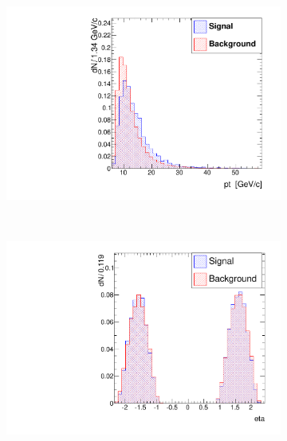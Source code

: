 \documentclass[10pt,a4paper]{article}
\begin{document}
\begin{figure}
        \centering
        \begin{subfigure}[b]{0.2\textwidth}
                \centering
                \includegraphics[width=\textwidth]{Figures/pt_endcaps}
                \label{fig:ptEndcaps}
        \end{subfigure}
        ~
        \begin{subfigure}[b]{0.2\textwidth}
                \centering
                \includegraphics[width=\textwidth]{Figures/eta_endcaps}
                \label{fig:etaEndcaps}
        \end{subfigure}
        ~
        \begin{subfigure}[b]{0.2\textwidth}

\end{subfigure}
\end{figure}
\end{document}
